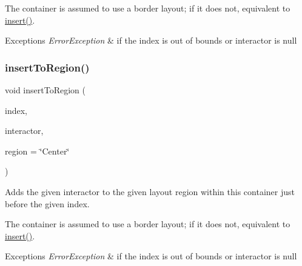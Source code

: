 The container is assumed to use a border layout; if it does not, equivalent to \mbox{\hyperlink{classsgl_1_1GContainer_afffb8f789ff9a8466fbae5b846a0ebe7}{insert()}}. 
\begin{DoxyExceptions}{Exceptions}
{\em Error\+Exception} & if the index is out of bounds or interactor is null \\
\hline
\end{DoxyExceptions}
\mbox{\label{classsgl_1_1GContainer_adeeb03feb9346a9cf2046427484c20bc}} 
\subsubsection{\texorpdfstring{insert\+To\+Region()}{insertToRegion()}\hspace{0.1cm}{\footnotesize\ttfamily [2/4]}}
{\footnotesize\ttfamily void insert\+To\+Region (\begin{DoxyParamCaption}\item[{int}]{index,  }\item[{\mbox{\hyperlink{classsgl_1_1GInteractor}{G\+Interactor}} $\ast$}]{interactor,  }\item[{const std\+::string \&}]{region = {\ttfamily \char`\"{}Center\char`\"{}} }\end{DoxyParamCaption})\hspace{0.3cm}{\ttfamily [virtual]}}



Adds the given interactor to the given layout region within this container just before the given index. 

The container is assumed to use a border layout; if it does not, equivalent to \mbox{\hyperlink{classsgl_1_1GContainer_afffb8f789ff9a8466fbae5b846a0ebe7}{insert()}}. 
\begin{DoxyExceptions}{Exceptions}
{\em Error\+Exception} & if the index is out of bounds or interactor is null \\
\hline
\end{DoxyExceptions}
\mbox{\label{classsgl_1_1GContainer_a1be2b263cd8d28e61e136a19d8e935cc}} 
